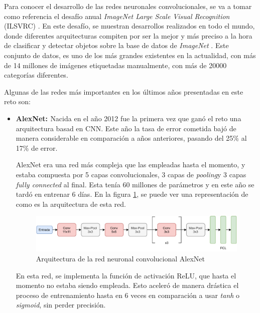 Para conocer el desarrollo de las redes neuronales convolucionales, se va a tomar como referencia el desafío anual \textit{ImageNet Large Scale Visual Recognition} (ILSVRC) \cite{russakovsky2015imagenet}. En este desafío, se muestran desarrollos realizados en todo el mundo, donde diferentes arquitecturas compiten por ser la mejor y más preciso a la hora de clasificar y detectar objetos sobre la base de datos de \textit{ImageNet} \cite{5206848}. Este conjunto de datos, es uno de los más grandes existentes en la actualidad, con más de 14 millones de imágenes etiquetadas manualmente, con más de 20000 categorías diferentes. 

Algunas de las redes más importantes en los últimos años presentadas en este reto son:

\begin{itemize}
    \item \textbf{AlexNet: \cite{NIPS2012_c399862d}} Nacida en el año 2012 fue la primera vez que ganó el reto una arquitectura basad en CNN. Este año la tasa de error cometida bajó de manera considerable en comparación a años anteriores, pasando del 25\% al 17\% de error. 
    
    AlexNet era una red más compleja que las empleadas hasta el momento, y estaba compuesta por 5 capas convolucionales, 3 capas de \textit{pooling}y 3 capas \textit{fully connected} al final. Esta tenía 60 millones de parámetros y en este año se tardó en entrenar 6 días. En la figura \ref{fig:alexnet}, se puede ver una representación de como es la arquitectura de esta red.\\
    
    \begin{figure}[!h]
        \centering
        \includegraphics[width=\textwidth]{figuras/desarrollo teorico/desarrollo_teorico-AlexNet.pdf}
        \caption{Arquitectura de la red neuronal convolucional AlexNet}
        \label{fig:alexnet}
    \end{figure}
    
    En esta red, se implementa la función de activación ReLU, que hasta el momento no estaba siendo empleada. Esto aceleró de manera drástica el proceso de entrenamiento hasta en 6 veces en comparación a usar \textit{tanh} o \textit{sigmoid}, sin perder precisión.
    

\end{itemize}
